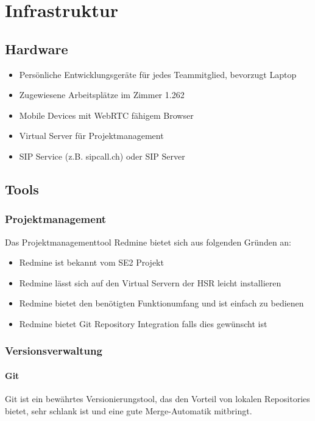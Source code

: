 \chapter{Infrastruktur}

\section{Hardware}
\begin{itemize}
	\setlength{\itemsep}{-\parsep}
	\item Persönliche Entwicklungsgeräte für jedes Teammitglied, bevorzugt Laptop
	\item Zugewiesene Arbeitsplätze im Zimmer 1.262
	\item Mobile Devices mit WebRTC fähigem Browser
	\item Virtual Server für Projektmanagement
	\item SIP Service (z.B. sipcall.ch) oder SIP Server
\end{itemize}

\section{Tools}
\subsection{Projektmanagement}
Das Projektmanagementtool Redmine bietet sich aus folgenden Gründen an:
\begin{itemize}
	\setlength{\itemsep}{-\parsep}
	\item Redmine ist bekannt vom SE2 Projekt
	\item Redmine lässt sich auf den Virtual Servern der HSR leicht installieren
	\item Redmine bietet den benötigten Funktionumfang und ist einfach zu bedienen
	\item Redmine bietet Git Repository Integration falls dies gewünscht ist
\end{itemize}


\subsection{Versionsverwaltung}
\subsubsection{Git}
Git ist ein bewährtes Versionierungstool, das den Vorteil von lokalen Repositories bietet, sehr schlank ist und eine gute Merge-Automatik mitbringt.

